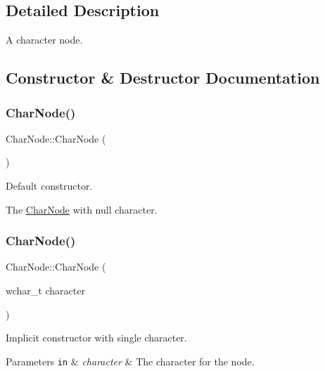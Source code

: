 \subsection{Detailed Description}
A character node. 

\subsection{Constructor \& Destructor Documentation}
\mbox{\label{classlakoo_1_1_char_node_ab9fabb1a5e13efdddee7b59bf8a1e653}} 
\subsubsection{\texorpdfstring{Char\+Node()}{CharNode()}\hspace{0.1cm}{\footnotesize\ttfamily [1/2]}}
{\footnotesize\ttfamily Char\+Node\+::\+Char\+Node (\begin{DoxyParamCaption}{ }\end{DoxyParamCaption})}



Default constructor. 

The \hyperlink{classlakoo_1_1_char_node}{Char\+Node} with null character. \mbox{\label{classlakoo_1_1_char_node_adbe83f97e8225dd1c61f76ce421fc29e}} 
\subsubsection{\texorpdfstring{Char\+Node()}{CharNode()}\hspace{0.1cm}{\footnotesize\ttfamily [2/2]}}
{\footnotesize\ttfamily Char\+Node\+::\+Char\+Node (\begin{DoxyParamCaption}\item[{wchar\+\_\+t}]{character }\end{DoxyParamCaption})}



Implicit constructor with single character. 


\begin{DoxyParams}[1]{Parameters}
\mbox{\tt in}  & {\em character} & The character for the node. \\
\hline
\end{DoxyParams}


